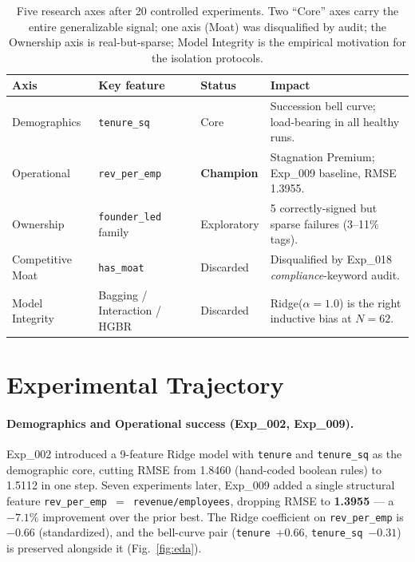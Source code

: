 \documentclass{article}
\begin{document}
\begin{table}[h]
  \caption{Five research axes after 20 controlled experiments. Two ``Core'' axes carry
  the entire generalizable signal; one axis (Moat) was disqualified by audit; the
  Ownership axis is real-but-sparse; Model Integrity is the empirical motivation for the
  isolation protocols.}
  \label{tab:axes}
  \centering\small
  \begin{tabular}{@{}lllp{2.05in}@{}}
    \toprule
    \textbf{Axis} & \textbf{Key feature} & \textbf{Status} & \textbf{Impact} \\
    \midrule
    Demographics      & \texttt{tenure\_sq}          & Core         & Succession bell curve; load-bearing in all healthy runs. \\
    Operational       & \texttt{rev\_per\_emp}       & \textbf{Champion} & Stagnation Premium; Exp\_009 baseline, RMSE 1.3955. \\
    Ownership         & \texttt{founder\_led} family & Exploratory  & 5 correctly-signed but sparse failures (3--11\% tags). \\
    Competitive Moat  & \texttt{has\_moat}           & Discarded    & Disqualified by Exp\_018 \emph{compliance}-keyword audit. \\
    Model Integrity   & Bagging / Interaction / HGBR & Discarded    & Ridge($\alpha{=}1.0$) is the right inductive bias at $N{=}62$. \\
    \bottomrule
  \end{tabular}
\end{table}

\section{Experimental Trajectory}
\label{sec:trajectory}

\paragraph{Demographics and Operational success (Exp\_002, Exp\_009).}
Exp\_002 introduced a 9-feature Ridge model with \texttt{tenure} and \texttt{tenure\_sq}
as the demographic core, cutting RMSE from 1.8460 (hand-coded boolean rules) to 1.5112 in
one step. Seven experiments later, Exp\_009 added a single structural feature
\texttt{rev\_per\_emp $=$ revenue/employees}, dropping RMSE to \textbf{1.3955} --- a
$-7.1\%$ improvement over the prior best. The Ridge coefficient on \texttt{rev\_per\_emp}
is $-0.66$ (standardized), and the bell-curve pair (\texttt{tenure}~$+0.66$,
\texttt{tenure\_sq}~$-0.31$) is preserved alongside it (Fig.~\ref{fig:eda}).
\end{document}
